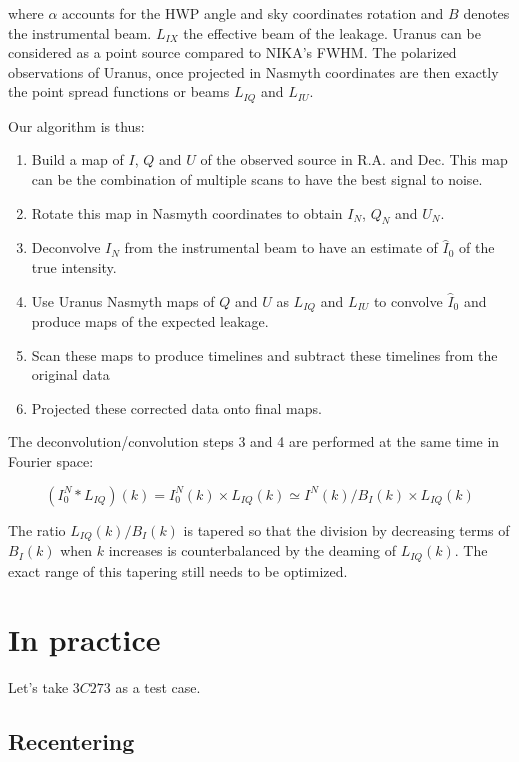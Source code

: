 \documentclass[a4paper,10pt]{article}
\begin{document}
where $\alpha$ accounts for the HWP angle and sky coordinates rotation and $B$ denotes
the instrumental beam. $L_{IX}$ the effective beam of the leakage. Uranus can
be considered as a point source compared to NIKA's FWHM. The polarized
observations of Uranus, once projected in Nasmyth
coordinates are then exactly the point spread functions or beams $L_{IQ}$ and
$L_{IU}$.

Our algorithm is thus:
\begin{enumerate}
\item Build a map of $I$, $Q$ and $U$ of the observed source in R.A. and
  Dec. This map can be the combination of multiple scans to have the best signal
  to noise.
\item Rotate this map in Nasmyth coordinates to obtain $I_N$, $Q_N$ and $U_N$.
\item Deconvolve $I_N$ from the instrumental beam to have an estimate of
  $\hat{I}_0$ of the true intensity.
\item Use Uranus Nasmyth maps of $Q$ and $U$ as $L_{IQ}$ and $L_{IU}$ to
  convolve $\hat{I}_0$ and produce maps of the expected leakage.
\item Scan these maps to produce timelines and subtract these timelines from the
  original data
\item Projected these corrected data onto final maps.
\end{enumerate}

The deconvolution/convolution steps 3 and 4 are performed at the same time in Fourier
space:

\begin{equation}
(I^N_0*L_{IQ})(k) = I^N_0(k) \times L_{IQ}(k) \simeq I^N(k)/B_I(k)\times L_{IQ}(k)
\end{equation}

The ratio $L_{IQ}(k)/B_I(k)$ is tapered so that the division by decreasing terms
of $B_I(k)$ when $k$ increases is counterbalanced by the deaming of
$L_{IQ}(k)$. The exact range of this tapering still needs to be optimized.


\section{In practice}

Let's take $3C273$ as a test case.

\subsection{Recentering}
\end{document}
